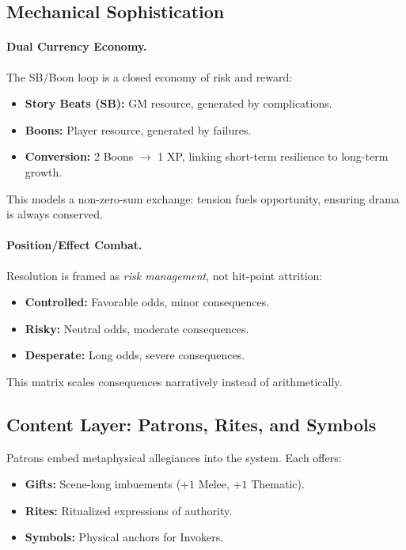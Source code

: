 \subsection{Mechanical Sophistication}

\paragraph{Dual Currency Economy.}
The SB/Boon loop is a closed economy of risk and reward:
\begin{itemize}
  \item \textbf{Story Beats (SB):} GM resource, generated by complications.
  \item \textbf{Boons:} Player resource, generated by failures.
  \item \textbf{Conversion:} 2 Boons $\rightarrow$ 1 XP, linking short-term resilience to long-term growth.
\end{itemize}

This models a non-zero-sum exchange: tension fuels opportunity, ensuring drama is always conserved.

\paragraph{Position/Effect Combat.}
Resolution is framed as \emph{risk management}, not hit-point attrition:
\begin{itemize}
  \item \textbf{Controlled:} Favorable odds, minor consequences.
  \item \textbf{Risky:} Neutral odds, moderate consequences.
  \item \textbf{Desperate:} Long odds, severe consequences.
\end{itemize}

This matrix scales consequences narratively instead of arithmetically.

\subsection{Content Layer: Patrons, Rites, and Symbols}

Patrons embed metaphysical allegiances into the system. Each offers:
\begin{itemize}
  \item \textbf{Gifts:} Scene-long imbuements (\(+1\) Melee, \(+1\) Thematic).
  \item \textbf{Rites:} Ritualized expressions of authority.
  \item \textbf{Symbols:} Physical anchors for Invokers.
\end{itemize}

